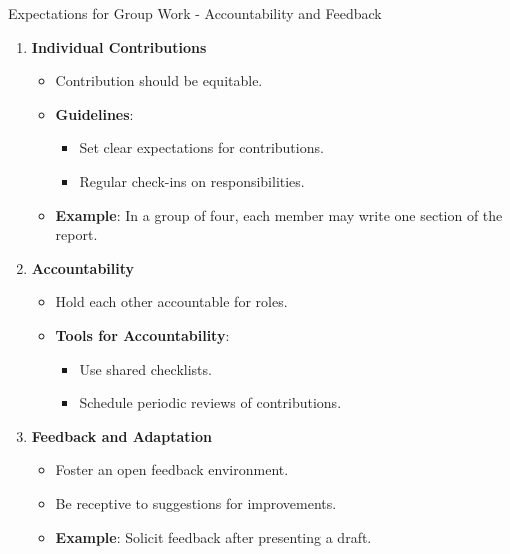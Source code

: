 \documentclass[aspectratio=169]{beamer}
\begin{document}
\begin{frame}[fragile]{Expectations for Group Work - Accountability and Feedback}
    \begin{enumerate}[resume]
        \item \textbf{Individual Contributions}
        \begin{itemize}
            \item Contribution should be equitable.
            \item \textbf{Guidelines}:
            \begin{itemize}
                \item Set clear expectations for contributions.
                \item Regular check-ins on responsibilities.
            \end{itemize}
            \item \textbf{Example}: In a group of four, each member may write one section of the report.
        \end{itemize}

        \item \textbf{Accountability}
        \begin{itemize}
            \item Hold each other accountable for roles.
            \item \textbf{Tools for Accountability}:
            \begin{itemize}
                \item Use shared checklists.
                \item Schedule periodic reviews of contributions.
            \end{itemize}
        \end{itemize}

        \item \textbf{Feedback and Adaptation}
        \begin{itemize}
            \item Foster an open feedback environment.
            \item Be receptive to suggestions for improvements.
            \item \textbf{Example}: Solicit feedback after presenting a draft.
        \end{itemize}
    \end{enumerate}
\end{frame}
\end{document}
